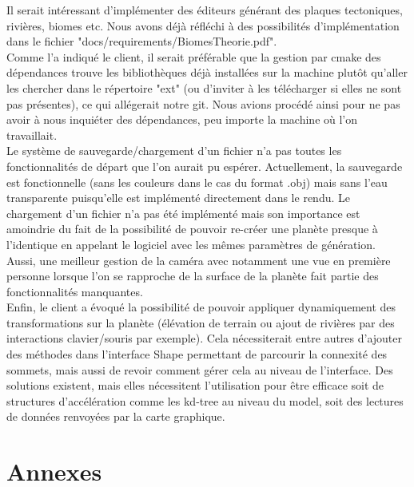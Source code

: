 \documentclass[a4paper]{article}
\begin{document}
Il serait intéressant d'implémenter des éditeurs générant des plaques tectoniques, rivières, biomes etc. Nous avons déjà réfléchi à des possibilités d'implémentation dans le fichier "docs/requirements/BiomesTheorie.pdf". \\

Comme l'a indiqué le client, il serait préférable que la gestion par cmake des dépendances trouve les bibliothèques déjà installées sur la machine plutôt qu'aller les chercher dans le répertoire "ext" (ou d'inviter à les télécharger si elles ne sont pas présentes), ce qui allégerait notre git. Nous avions procédé ainsi pour ne pas avoir à nous inquiéter des dépendances, peu importe la machine où l'on travaillait.\\

Le système de sauvegarde/chargement d'un fichier n'a pas toutes les fonctionnalités de départ que l'on aurait pu espérer. Actuellement, la sauvegarde est fonctionnelle (sans les couleurs dans le cas du format .obj) mais sans l'eau transparente puisqu'elle est implémenté directement dans le rendu. Le chargement d'un fichier n'a pas été implémenté mais son importance est amoindrie du fait de la possibilité de pouvoir re-créer une planète presque à l'identique en appelant le logiciel avec les mêmes paramètres de génération.\\

Aussi, une meilleur gestion de la caméra avec notamment une vue en première personne lorsque l'on se rapproche de la surface de la planète fait partie des fonctionnalités manquantes.\\

Enfin, le client a évoqué la possibilité de pouvoir appliquer dynamiquement des transformations sur la planète (élévation de terrain ou ajout de rivières par des interactions clavier/souris par exemple). Cela nécessiterait entre autres d'ajouter des méthodes dans l'interface Shape permettant de parcourir la connexité des sommets, mais aussi de revoir comment gérer cela au niveau de l'interface. Des solutions existent, mais elles nécessitent l'utilisation pour être efficace soit de structures d'accélération comme les kd-tree au niveau du model, soit des lectures de données renvoyées par la carte graphique.

\newpage
\section{Annexes}
\end{document}
